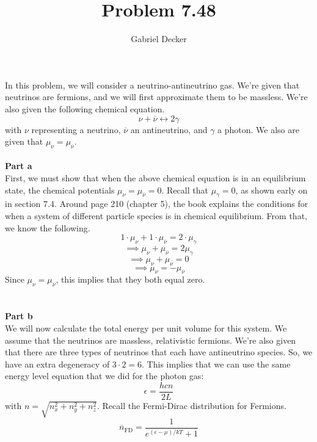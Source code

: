 \documentclass[12pt]{article}
\title{Problem 7.48}
\author{Gabriel Decker}
\begin{document}
\maketitle
\begin{flushleft}



In this problem, we will consider a neutrino-antineutrino gas.
We're given that neutrinos are fermions, and we will first approximate them to be massless.
We're also given the following chemical equation.
\begin{equation}
    \nu+\overline{\nu}\leftrightarrow2\gamma
\end{equation}
with $\nu$ representing a neutrino, $\overline{\nu}$ an antineutrino, and $\gamma$ a photon.
We also are given that $\mu_\nu=\mu_{\overline{\nu}}$.\\~\\


\textbf{Part a}\\
First, we must show that when the above chemical equation is in an equilibrium state, the chemical potentials $\mu_\nu=\mu_{\overline{\nu}}=0$.
Recall that $\mu_\gamma=0$, as shown early on in section 7.4.
Around page 210 (chapter 5), the book explains the conditions for when a system of different particle species is in chemical equilibrium.
From that, we know the following.
$$1\cdot\mu_\nu+1\cdot\mu_{\overline{\nu}}=2\cdot\mu_\gamma$$
$$\implies\mu_\nu+\mu_{\overline{\nu}}=2\mu_\gamma$$
$$\implies\mu_\nu+\mu_{\overline{\nu}}=0$$
$$\implies\mu_\nu=-\mu_{\overline{\nu}}$$
Since $\mu_\nu=\mu_{\overline{\nu}}$, this implies that they both equal zero.\\~\\~\\


\textbf{Part b}\\
We will now calculate the total energy per unit volume for this system.
We assume that the neutrinos are massless, relativistic fermions.
We're also given that there are three types of neutrinos that each have antineutrino species.
So, we have an extra degeneracy of $3\cdot2=6$.
This implies that we can use the same energy level equation that we did for the photon gas:
\begin{equation}
    \epsilon=\frac{hcn}{2L}
\end{equation}
with $n=\sqrt{n_x^2+n_y^2+n_z^2}$.
Recall the Fermi-Dirac distribution for Fermions.
\begin{equation}
    \overline{n}_\text{FD}=\frac{1}{e^{(\epsilon-\mu)/kT}+1}
\end{equation}\\~\\


\end{flushleft}
\end{document}
